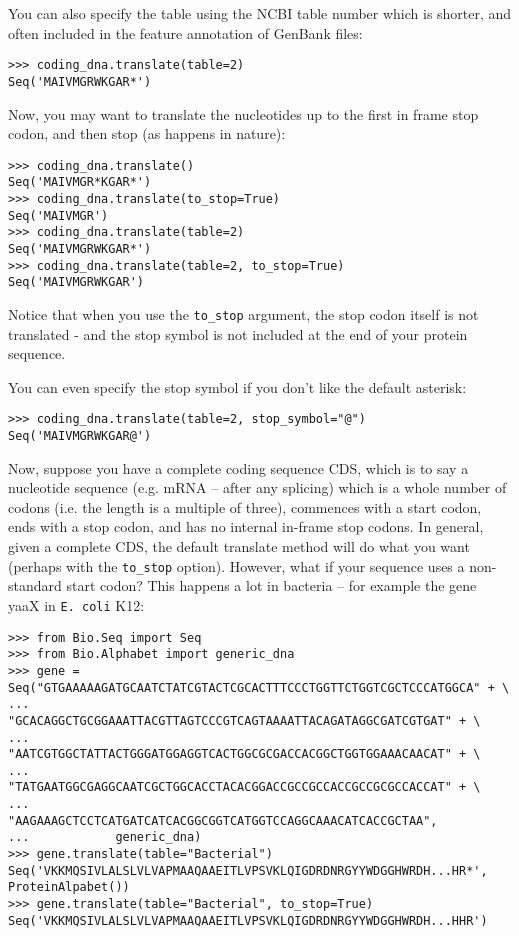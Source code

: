 You can also specify the table using the NCBI table number which is shorter, and often included in the feature annotation of GenBank files:

\begin{verbatim}
>>> coding_dna.translate(table=2)
Seq('MAIVMGRWKGAR*')
\end{verbatim}

Now, you may want to translate the nucleotides up to the first in frame stop codon,
and then stop (as happens in nature):

\begin{verbatim}
>>> coding_dna.translate()
Seq('MAIVMGR*KGAR*')
>>> coding_dna.translate(to_stop=True)
Seq('MAIVMGR')
>>> coding_dna.translate(table=2)
Seq('MAIVMGRWKGAR*')
>>> coding_dna.translate(table=2, to_stop=True)
Seq('MAIVMGRWKGAR')
\end{verbatim}
\noindent Notice that when you use the \verb|to_stop| argument, the stop codon itself
is not translated - and the stop symbol is not included at the end of your protein
sequence.

You can even specify the stop symbol if you don't like the default asterisk:

\begin{verbatim}
>>> coding_dna.translate(table=2, stop_symbol="@")
Seq('MAIVMGRWKGAR@')
\end{verbatim}

Now, suppose you have a complete coding sequence CDS, which is to say a
nucleotide sequence (e.g. mRNA -- after any splicing) which is a whole number
of codons (i.e. the length is a multiple of three), commences with a start
codon, ends with a stop codon, and has no internal in-frame stop codons.
In general, given a complete CDS, the default translate method will do what
you want (perhaps with the \verb|to_stop| option). However, what if your
sequence uses a non-standard start codon? This happens a lot in bacteria --
for example the gene yaaX in \texttt{E. coli} K12:

\begin{verbatim}
>>> from Bio.Seq import Seq
>>> from Bio.Alphabet import generic_dna
>>> gene = Seq("GTGAAAAAGATGCAATCTATCGTACTCGCACTTTCCCTGGTTCTGGTCGCTCCCATGGCA" + \
...            "GCACAGGCTGCGGAAATTACGTTAGTCCCGTCAGTAAAATTACAGATAGGCGATCGTGAT" + \
...            "AATCGTGGCTATTACTGGGATGGAGGTCACTGGCGCGACCACGGCTGGTGGAAACAACAT" + \
...            "TATGAATGGCGAGGCAATCGCTGGCACCTACACGGACCGCCGCCACCGCCGCGCCACCAT" + \
...            "AAGAAAGCTCCTCATGATCATCACGGCGGTCATGGTCCAGGCAAACATCACCGCTAA",
...            generic_dna)
>>> gene.translate(table="Bacterial")
Seq('VKKMQSIVLALSLVLVAPMAAQAAEITLVPSVKLQIGDRDNRGYYWDGGHWRDH...HR*',
ProteinAlpabet())
>>> gene.translate(table="Bacterial", to_stop=True)
Seq('VKKMQSIVLALSLVLVAPMAAQAAEITLVPSVKLQIGDRDNRGYYWDGGHWRDH...HHR')
\end{verbatim}

